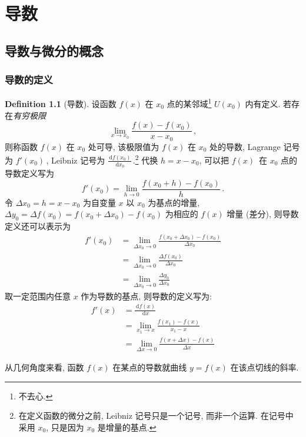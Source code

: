 \documentclass{book}
\newcommand{\dd}{\,\mathrm{d}}
\newcommand{\f}{$f(x)$}
\renewcommand{\U}[1]{U\!\left( #1 \right)}%
\numberwithin{equation}{section}
\numberwithin{figure}{section}
\theoremstyle{definition}
\newtheorem{definition}{Definition}
\begin{document}
\chapter{导数}
\section{导数与微分的概念}
\subsection{导数的定义}
\begin{definition}[导数]
  设函数 $f(x)$ 在 $x_0$ 点的某邻域\footnote{不去心.} $\U{x_0}$ 内有定义. 若存在\emph{有穷极限}
  \begin{equation*}
    \lim_{x\to x_0}\frac{f(x)-f(x_0)}{x-x_0}\,,
  \end{equation*}
  则称函数 $f(x)$ 在 $x_0$ 处可导, 该极限值为 $f(x)$ 在 $x_0$ 处的导数, Lagrange 记号为 $f'(x_0)$\,, Leibniz 记号为 $\frac{\dd f(x_0)}{\dd x_0}\,$.\footnote{在定义函数的微分之前, Leibniz 记号只是一个记号, 而非一个运算. 在记号中采用 $x_0$, 只是因为 $x_0$ 是增量的基点.}
  代换 $h=x-x_0$, 可以把 \f\ 在 $x_0$ 点的导数定义写为
  \begin{equation*}
    f'(x_0)=\lim_{h\to 0}\frac{f(x_0+h)-f(x_0)}{h}\,.
  \end{equation*}
  令 $\Delta x_0=h=x-x_0$ 为自变量 $x$ 以 $x_0$ 为基点的增量, $\Delta y_0=\Delta f(x_0)=f(x_0+\Delta x_0)-f(x_0)$ 为相应的 $f(x)$ 增量 (差分), 则导数定义还可以表示为
  \begin{align*}
    f'(x_0)&=\lim_{\Delta x_0\to 0}\frac{f(x_0+\Delta x_0)-f(x_0)}{\Delta x_0}\\
    &=\lim_{\Delta x_0\to 0}\frac{\Delta f(x_0)}{\Delta x_0}\\
    &=\lim_{\Delta x_0\to 0}\frac{\Delta y_0}{\Delta x_0}
  \end{align*}
  取一定范围内任意 $x$ 作为导数的基点, 则导数的定义写为:
  \begin{align*}
    f'(x)&=\frac{\dd f(x)}{\dd x}\\
    &=\lim_{x_1\to x}\frac{f(x_1)-f(x)}{x_1-x}\\
    &=\lim_{\Delta x\to 0}\frac{f(x+\Delta x)-f(x)}{\Delta x}
  \end{align*}
\end{definition}

从几何角度来看, 函数 $f(x)$ 在某点的导数就曲线 $y=f(x)$ 在该点切线的斜率.
\end{document}
